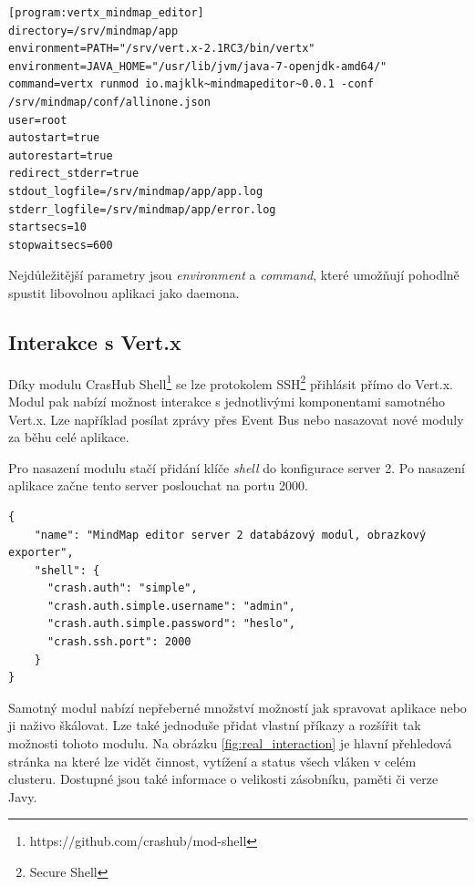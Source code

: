 \begin{lstlisting}[caption=Konfigurace produkční služby]
[program:vertx_mindmap_editor]
directory=/srv/mindmap/app
environment=PATH="/srv/vert.x-2.1RC3/bin/vertx"
environment=JAVA_HOME="/usr/lib/jvm/java-7-openjdk-amd64/"
command=vertx runmod io.majklk~mindmapeditor~0.0.1 -conf /srv/mindmap/conf/allinone.json
user=root
autostart=true
autorestart=true
redirect_stderr=true
stdout_logfile=/srv/mindmap/app/app.log
stderr_logfile=/srv/mindmap/app/error.log
startsecs=10
stopwaitsecs=600
\end{lstlisting}

Nejdůležitější parametry jsou \emph{environment} a \emph{command}, které umožňují pohodlně spustit libovolnou aplikaci jako daemona.

\subsection{Interakce s Vert.x}\label{sub:interaction}

Díky modulu CrasHub Shell\footnote{https://github.com/crashub/mod-shell} se lze protokolem SSH\footnote{Secure Shell} přihlásit přímo do Vert.x. Modul pak nabízí možnost interakce s jednotlivými komponentami samotného Vert.x. Lze například posílat zprávy přes Event Bus nebo nasazovat nové moduly za běhu celé aplikace.

Pro nasazení modulu stačí přidání klíče \emph{shell} do konfigurace server 2. Po nasazení aplikace začne tento server poslouchat na portu 2000.

\begin{lstlisting}[caption={Konfigurace modulu CrasHub Shell},label=confServ2]
{
    "name": "MindMap editor server 2 databázový modul, obrazkový exporter",
    "shell": {
      "crash.auth": "simple",
      "crash.auth.simple.username": "admin",
      "crash.auth.simple.password": "heslo",
      "crash.ssh.port": 2000
    }
}
\end{lstlisting}

Samotný modul nabízí nepřeberné množství možností jak spravovat aplikace nebo ji naživo škálovat. Lze také jednoduše přidat vlastní příkazy a rozšířit tak možnosti tohoto modulu. Na obrázku \ref{fig:real_interaction} je hlavní přehledová stránka na které lze vidět činnost, vytížení a status všech vláken v celém clusteru. Dostupné jsou také informace o velikosti zásobníku, paměti či verze Javy. 

